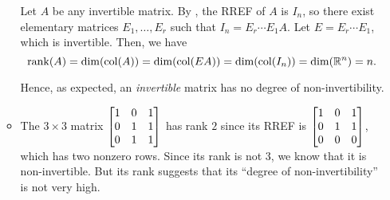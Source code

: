 \begin{enumerate}
\begin{itemize}
\begin{pf}
Let \(A\) be any invertible matrix. By , the
RREF of \(A\) is \(I_n\), so there exist elementary matrices \(E_1,\dotsc,E_r\)
such that \(I_n=E_r\dotsb E_1 A\). Let \(E=E_r\dotsb E_1\), which is
invertible. Then, we have
\[
\operatorname{rank}(A)=\dim(\operatorname{col}(A))
=\dim(\operatorname{col}(EA))
=\dim(\operatorname{col}(I_n))
=\dim(\mathbb{R}^n)
=n.
\]
\end{pf}

Hence, as expected, an \emph{invertible} matrix has no degree of
non-invertibility.
\item The \(3\times 3\) matrix \(\mqty[1&0&1\\ 0&1&1\\ 0&1&1]\) has rank \(2\)
since its RREF is \(\mqty[1&0&1\\ 0&1&1\\ 0&0&0]\), which has two nonzero rows.
Since its rank is not \(3\), we know that it is non-invertible. But its rank
suggests that its ``degree of non-invertibility'' is not very high.
\end{itemize}
\end{enumerate}
